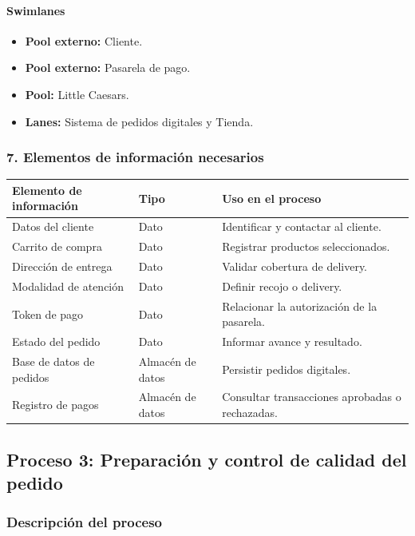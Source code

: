 \documentclass[a4paper,12pt]{article}
\begin{document}
\paragraph{Swimlanes}

\begin{itemize}
    \item \textbf{Pool externo:} Cliente.
    \item \textbf{Pool externo:} Pasarela de pago.
    \item \textbf{Pool:} Little Caesars.
    \item \textbf{Lanes:} Sistema de pedidos digitales y Tienda.
\end{itemize}

\subsubsection*{7. Elementos de información necesarios}

\begin{longtable}{P{5cm} P{5cm} P{4cm}}
\toprule
\textbf{Elemento de información} & \textbf{Tipo} & \textbf{Uso en el proceso} \\
\midrule
Datos del cliente & Dato & Identificar y contactar al cliente. \\
Carrito de compra & Dato & Registrar productos seleccionados. \\
Dirección de entrega & Dato & Validar cobertura de delivery. \\
Modalidad de atención & Dato & Definir recojo o delivery. \\
Token de pago & Dato & Relacionar la autorización de la pasarela. \\
Estado del pedido & Dato & Informar avance y resultado. \\
Base de datos de pedidos & Almacén de datos & Persistir pedidos digitales. \\
Registro de pagos & Almacén de datos & Consultar transacciones aprobadas o rechazadas. \\
\bottomrule
\end{longtable}

\subsection*{Proceso 3: Preparación y control de calidad del pedido}

\subsubsection*{Descripción del proceso}
\end{document}
